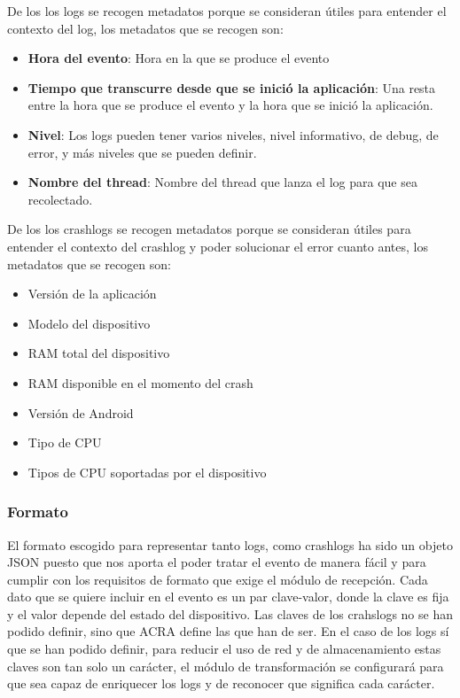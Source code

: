 De los los logs se recogen metadatos porque se consideran útiles para entender el contexto del log, los metadatos que se recogen son:

\begin{itemize}	
	\item \textbf{Hora del evento}: Hora en la que se produce el evento
	\item \textbf{Tiempo que transcurre desde que se inició la aplicación}: Una resta entre la hora que se produce el evento y la hora que se inició la aplicación.
	\item \textbf{Nivel}: Los logs pueden tener varios niveles, nivel informativo, de debug, de error, y más niveles que se pueden definir.
	\item \textbf{Nombre del thread}: Nombre del thread que lanza el log para que sea recolectado.
\end{itemize}

De los los crashlogs se recogen metadatos porque se consideran útiles para entender el contexto del crashlog y poder solucionar el error cuanto antes, los metadatos que se recogen son:

\begin{itemize}
	\item Versión de la aplicación
	\item Modelo del dispositivo
	\item RAM total del dispositivo
	\item RAM disponible en el momento del crash
	\item Versión de Android
	\item Tipo de CPU
	\item Tipos de CPU soportadas por el dispositivo
\end{itemize}

\subsubsection{Formato}
El formato escogido para representar tanto logs, como crashlogs ha sido un objeto JSON puesto que nos aporta el poder tratar el evento de manera fácil y para cumplir con los requisitos de formato que exige el módulo de recepción. Cada dato que se quiere incluir en el evento es un par clave-valor, donde la clave es fija y el valor depende del estado del dispositivo. Las claves de los crahslogs no se han podido definir, sino que ACRA define las que han de ser. En el caso de los logs sí que se han podido definir, para reducir el uso de red y de almacenamiento estas claves son tan solo un carácter, el módulo de transformación se configurará para que sea capaz de enriquecer los logs y de reconocer que significa cada carácter. 

